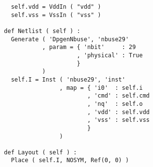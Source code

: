 \begin{itemize}
\begin{verbatim}
    self.vdd = VddIn ( "vdd" )
    self.vss = VssIn ( "vss" )
    
  def Netlist ( self ) :
    Generate ( 'DpgenNbuse', 'nbuse29'
             , param = { 'nbit'     : 29
                       , 'physical' : True
                       }
             )
    self.I = Inst ( 'nbuse29', 'inst'
                  , map = { 'i0'  : self.i
                          , 'cmd' : self.cmd
                          , 'nq'  : self.o
                          , 'vdd' : self.vdd
                          , 'vss' : self.vss
                          }
                  )
    
  def Layout ( self ) :
    Place ( self.I, NOSYM, Ref(0, 0) )
\end{verbatim}
\end{itemize}
